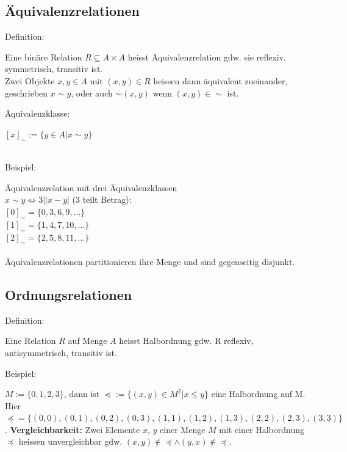\documentclass[8pt,landscape]{scrartcl}
\begin{document}
\begin{multicols}{3}
\subsection{\"Aquivalenzrelationen}
\begin{bf}Definition:\end{bf} Eine bin\"are Relation $R \subseteq A \times A $ heisst \"Aquivalenzrelation gdw. sie reflexiv, symmetrisch, transitiv ist.\\
Zwei Objekte $x, y \in A$ mit $(x, y) \in R$ heissen dann \"aquivalent zueinander, geschrieben $x \sim y$, oder auch $\sim (x, y)$ wenn $(x, y) \in \sim$ ist.\\
\begin{bf}\"Aquivalenzklasse:\end{bf} $\left[x\right]_{\sim} := \{ y \in A | x \sim y \}$\\\\ 
\begin{bf}Beispiel:\end{bf} \"Aquivalenzrelation mit drei \"Aquivalenzklassen\\
$x \sim y \iff 3| \left| x - y \right|$ (3 teilt Betrag):\\
$\left[0\right]_{\sim} = \{ 0, 3, 6, 9, ...\}$\\
$\left[1\right]_{\sim} = \{ 1, 4, 7, 10, ...\}$\\
$\left[2\right]_{\sim} = \{ 2, 5, 8, 11, ...\}$\\\\
\"Aquivalenzrelationen partitionieren ihre Menge und sind gegenseitig disjunkt.

\subsection{Ordnungsrelationen}
\begin{bf}Definition:\end{bf} Eine Relation $R$ auf Menge $A$ heisst Halbordnung gdw. R reflexiv, antisymmetrisch, transitiv ist.\\
\begin{bf}Beispiel:\end{bf} $M := \{0, 1, 2, 3\}$, dann ist $\preceq := \{ (x, y) \in M^2 | x \leq y \}$ eine Halbordnung auf M.
Hier $\preceq = \{ (0, 0), (0, 1), (0, 2), (0, 3), (1, 1), (1, 2), (1, 3), (2, 2), (2, 3), (3, 3)\}$.
\textbf{Vergleichbarkeit:} Zwei Elemente $x$, $y$ einer Menge $M$ mit einer Halbordnung $\preceq$ heissen unvergleichbar gdw. $(x, y) \not \in \preceq \land (y, x) \not \in \preceq$.


\end{multicols}
\end{document}
